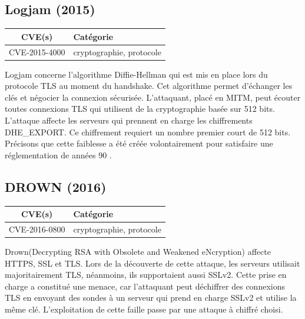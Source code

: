 \subsection{Logjam (2015)}

\begin{tabularx}{0.96\textwidth}{|c|X|}
  \hline
  \textbf{CVE(s)} & \textbf{Catégorie} \\
  \hline
  CVE-2015-4000 & cryptographie, protocole \\
  \hline
\end{tabularx}

\vspace{1em}

Logjam concerne l'algorithme Diffie-Hellman qui est mis en place lors du protocole TLS au moment du handshake. Cet algorithme permet d'échanger les clés et négocier la connexion sécurisée. L'attaquant, placé en MITM, peut écouter toutes connexions TLS qui utilisent de la cryptographie basée sur 512 bits. L'attaque affecte les serveurs qui prennent en charge les chiffrements DHE\_EXPORT. Ce chiffrement requiert un nombre premier court de 512 bits. Précisons que cette faiblesse a été créée volontairement pour satisfaire une réglementation de années 90
\cite{logjam}.




\subsection{DROWN (2016)}

\begin{tabularx}{0.96\textwidth}{|c|X|}
  \hline
  \textbf{CVE(s)} & \textbf{Catégorie} \\
  \hline
  CVE-2016-0800 & cryptographie, protocole \\
  \hline
\end{tabularx}

\vspace{1em}

Drown(Decrypting RSA with Obsolete and Weakened eNcryption) affecte HTTPS, SSL et TLS. Lors de la découverte de cette attaque, les serveurs utilisait majoritairement TLS, néanmoins, ils supportaient aussi SSLv2. Cette prise en charge a constitué une menace, car l'attaquant peut déchiffrer des connexions TLS en envoyant des sondes à un serveur qui prend en charge SSLv2 et utilise la même clé. L'exploitation de cette faille passe par une attaque à chiffré choisi\cite{drown}.


